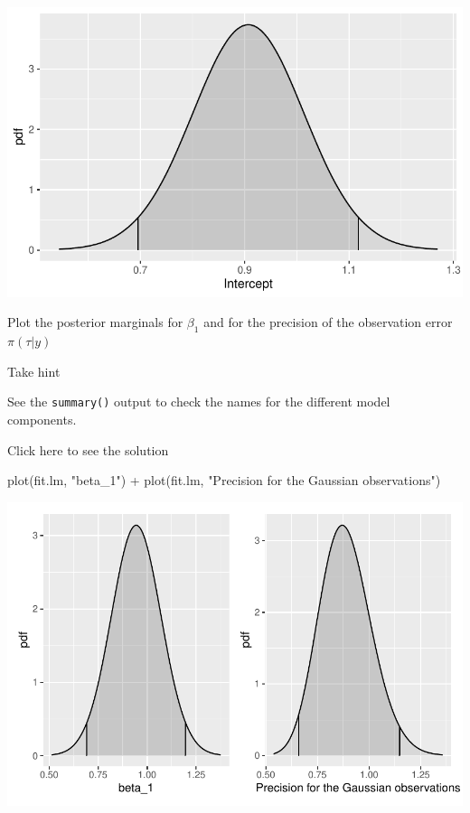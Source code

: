 \documentclass[
  letterpaper,
  DIV=11,
  numbers=noendperiod]{scrartcl}
\newenvironment{Shaded}{\begin{snugshade}}{\end{snugshade}}
\newcommand{\FunctionTok}[1]{\textcolor[rgb]{0.28,0.35,0.67}{#1}}
\newcommand{\NormalTok}[1]{\textcolor[rgb]{0.00,0.23,0.31}{#1}}
\newcommand{\SpecialCharTok}[1]{\textcolor[rgb]{0.37,0.37,0.37}{#1}}
\newcommand{\StringTok}[1]{\textcolor[rgb]{0.13,0.47,0.30}{#1}}
\begin{document}
\includegraphics{day1_practical_files/figure-pdf/unnamed-chunk-14-1.pdf}

\begin{tcolorbox}[enhanced jigsaw, opacitybacktitle=0.6, rightrule=.15mm, colframe=quarto-callout-warning-color-frame, leftrule=.75mm, opacityback=0, colback=white, bottomtitle=1mm, arc=.35mm, coltitle=black, titlerule=0mm, breakable, toptitle=1mm, left=2mm, toprule=.15mm, bottomrule=.15mm, title={Task}, colbacktitle=quarto-callout-warning-color!10!white]

Plot the posterior marginals for \(\beta_1\) and for the precision of
the observation error \(\pi(\tau|y)\)

Take hint

See the \texttt{summary()} output to check the names for the different
model components.

Click here to see the solution

\begin{Shaded}
\begin{Highlighting}[]
\FunctionTok{plot}\NormalTok{(fit.lm, }\StringTok{"beta\_1"}\NormalTok{) }\SpecialCharTok{+}
\FunctionTok{plot}\NormalTok{(fit.lm, }\StringTok{"Precision for the Gaussian observations"}\NormalTok{)}
\end{Highlighting}
\end{Shaded}

\begin{center}
\includegraphics{day1_practical_files/figure-pdf/unnamed-chunk-15-1.pdf}
\end{center}

\end{tcolorbox}
\end{document}
